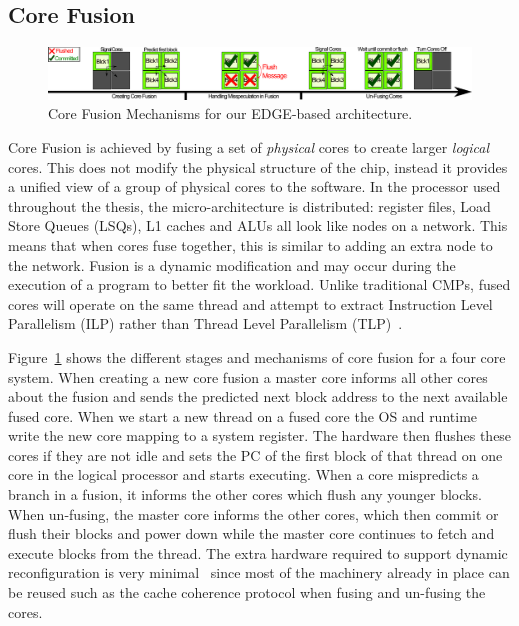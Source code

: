 \subsection{Core Fusion}
 \begin{figure}[t]
 \center
 \includegraphics[width=1\textwidth]{cases-paper/graphics/background/proc_test.pdf}
 \caption{Core Fusion Mechanisms for our EDGE-based architecture.}\label{fig:dmp}
 \end{figure}
 
Core Fusion is achieved by fusing a set of \textit{physical} cores to create larger \textit{logical} cores.
This does not modify the physical structure of the chip, instead it provides a unified view of a group of physical cores to the software.
In the processor used throughout the thesis, the micro-architecture is distributed: register files, Load Store Queues (LSQs), L1 caches and ALUs all look like nodes on a network.
This means that when cores fuse together, this is similar to adding an extra node to the network.
Fusion is a dynamic modification and may occur during the execution of a program to better fit the workload.
Unlike traditional CMPs, fused cores will operate on the same thread and attempt to extract Instruction Level Parallelism (ILP) rather than Thread Level Parallelism (TLP)~\cite{micolet2016dmpstream,pricopi2012bahurupi}.

Figure~\ref{fig:dmp} shows the different stages and mechanisms of core fusion for a four core system.
When creating a new core fusion a master core informs all other cores about the fusion and sends the predicted next block address to the next available fused core.
When we start a new thread on a fused core the OS and runtime write the new core mapping to a system register.
The hardware then flushes these cores if they are not idle and sets the PC of the first block of that thread on one core in the logical processor and starts executing.
When a core mispredicts a branch in a fusion, it informs the other cores which flush any younger blocks.
When un-fusing, the master core informs the other cores, which then commit or flush their blocks and power down while the master core continues to fetch and execute blocks from the thread.
The extra hardware required to support dynamic reconfiguration is very minimal~\cite{kim2007tflex} since most of the machinery already in place can be reused such as the cache coherence protocol when fusing and un-fusing the cores.

